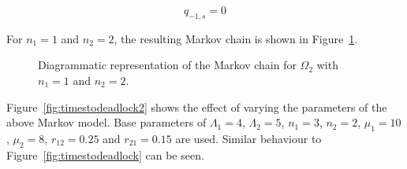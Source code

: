 \documentclass{article}
\begin{document}
\begin{equation}
  q_{-1, s} = 0
\end{equation}

For $n_1 = 1$ and $n_2 = 2$, the resulting Markov chain is shown in Figure~\ref{fig:2nodeMC}.

\begin{figure}[!htbp]
    \begin{center}
    
    \end{center}
    \caption{Diagrammatic representation of the Markov chain for $\Omega_2$ with $n_1=1$ and $n_2=2$.}
    \label{fig:2nodeMC}
\end{figure}

Figure~\ref{fig:timestodeadlock2} shows the effect of varying the parameters of the above Markov model.
Base parameters of $\Lambda_1 = 4$, $\Lambda_2 = 5$, $n_1 = 3$, $n_2 = 2$, $\mu_1 = 10$, $\mu_2 = 8$, $r_{12} = 0.25$ and $r_{21} = 0.15$ are used.
Similar behaviour to Figure~\ref{fig:timestodeadlock} can be seen.
\end{document}
